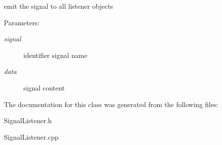 emit the signal to all listener objects \begin{Desc}
\item[Parameters:]
\begin{description}
\item[{\em signal}]identifier signal name \item[{\em data}]signal content \end{description}
\end{Desc}


The documentation for this class was generated from the following files:\begin{CompactItemize}
\item 
SignalListener.h\item 
SignalListener.cpp\end{CompactItemize}
